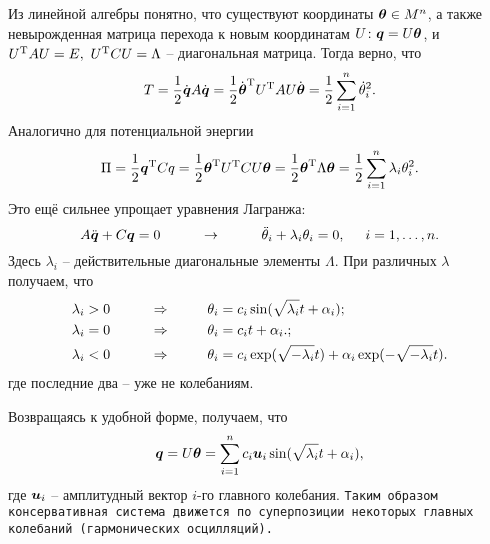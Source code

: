 Из линейной алгебры понятно, что существуют координаты $\mbox{\boldmath $\theta$} \in M^n$, а также невырожденная матрица перехода к новым координатам $U \colon \mbox{\boldmath $q$} = U \mbox{\boldmath $\theta$}$, и $U^{\text{T}} A U = E, \ U^{\text{T}} C U = \Lambda$ -- диагональная матрица. Тогда верно, что
\begin{equation*}
    T = \frac{1}{2} \dot{\mbox{\boldmath $q$}} A \dot{\mbox{\boldmath $q$}} = \frac{1}{2} \dot{\mbox{\boldmath $\theta$}}^{\text{T}} U^{\text{T}} A U \dot{\mbox{\boldmath $\theta$}} = 
    \frac{1}{2} \sum_{i=1}^{n} \dot{\theta}_i^2.
\end{equation*}
Аналогично для потенциальной энергии
\begin{equation*}
    \Pi = \frac{1}{2} \mbox{\boldmath $q$}^{\text{T}} C q = \frac{1}{2} \mbox{\boldmath $\theta$}^{\text{T}} U^{\text{T}} C U \mbox{\boldmath $\theta$} 
    = \frac{1}{2} \mbox{\boldmath $\theta$}^{\text{T}} \Lambda \mbox{\boldmath $\theta$}
    = \frac{1}{2} \sum_{i=1}^{n} \lambda _i \theta_i^2
    .
\end{equation*}
Это ещё сильнее упрощает уравнения Лагранжа:
\begin{equation*}
    A \ddot{\mbox{\boldmath $q$}} + C \mbox{\boldmath $q$} = 0
    \hspace{1 cm} \to \hspace{1 cm}
    \ddot{\theta}_i + \lambda_i \theta_i = 0, 
    \hspace{0.5 cm}
    i = 1, \ldots, n.
\end{equation*}
Здесь $\lambda_i$ -- действительные диагональные элементы $\Lambda$. При различных $\lambda$ получаем, что
\begin{align*}
    \lambda_i > 0 
    \hspace{1 cm} \Rightarrow \hspace{1 cm}
    & \theta_i = c_i \sin (\sqrt{\lambda_i} t + \alpha_i); \\
    \lambda_i = 0 
    \hspace{1 cm} \Rightarrow \hspace{1 cm}
    & \theta_i = c_i t + \alpha_i.; \\
    \lambda_i < 0 
    \hspace{1 cm} \Rightarrow \hspace{1 cm}
    & \theta_i = c_i \exp( \sqrt{-\lambda_i} t) + \alpha_i \exp(-  \sqrt{-\lambda_i} t). \\
\end{align*}
где последние два -- уже не  колебаниям.


Возвращаясь к удобной форме, получаем, что
\begin{equation*}
    \mbox{\boldmath $q$} = U \mbox{\boldmath $\theta$} = \sum_{i=1}^{n} c_i \mbox{\boldmath $u$}_i \sin (\sqrt{\lambda_i} t + \alpha_i),
\end{equation*}
где $\mbox{\boldmath $u$}_i$ -- амплитудный вектор $i$-го главного колебания.
\texttt{Таким образом консервативная система движется по суперпозиции некоторых главных колебаний (гармонических осцилляций).} 

